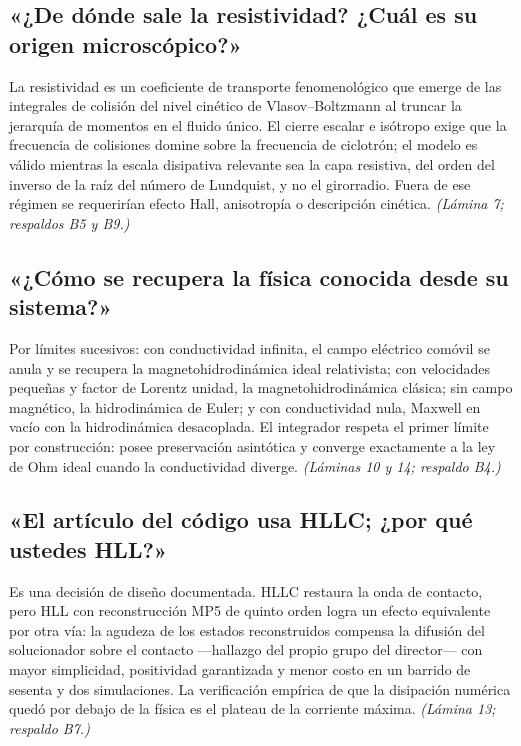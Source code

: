 \documentclass[11pt,letterpaper]{article}
\begin{document}
\subsection{«¿De dónde sale la resistividad? ¿Cuál es su origen microscópico?»}
La resistividad es un coeficiente de transporte fenomenológico que emerge
de las integrales de colisión del nivel cinético de Vlasov--Boltzmann al
truncar la jerarquía de momentos en el fluido único. El cierre escalar e
isótropo exige que la frecuencia de colisiones domine sobre la frecuencia
de ciclotrón; el modelo es válido mientras la escala disipativa relevante
sea la capa resistiva, del orden del inverso de la raíz del número de
Lundquist, y no el girorradio. Fuera de ese régimen se requerirían efecto
Hall, anisotropía o descripción cinética. \emph{(Lámina 7; respaldos B5 y
B9.)}

\subsection{«¿Cómo se recupera la física conocida desde su sistema?»}
Por límites sucesivos: con conductividad infinita, el campo eléctrico
comóvil se anula y se recupera la magnetohidrodinámica ideal relativista;
con velocidades pequeñas y factor de Lorentz unidad, la
magnetohidrodinámica clásica; sin campo magnético, la hidrodinámica de
Euler; y con conductividad nula, Maxwell en vacío con la hidrodinámica
desacoplada. El integrador respeta el primer límite por construcción:
posee preservación asintótica y converge exactamente a la ley de Ohm ideal
cuando la conductividad diverge. \emph{(Láminas 10 y 14; respaldo B4.)}

\subsection{«El artículo del código usa HLLC; ¿por qué ustedes HLL?»}
Es una decisión de diseño documentada. HLLC restaura la onda de contacto,
pero HLL con reconstrucción MP5 de quinto orden logra un efecto
equivalente por otra vía: la agudeza de los estados reconstruidos compensa
la difusión del solucionador sobre el contacto ---hallazgo del propio
grupo del director--- con mayor simplicidad, positividad garantizada y
menor costo en un barrido de sesenta y dos simulaciones. La verificación
empírica de que la disipación numérica quedó por debajo de la física es el
plateau de la corriente máxima. \emph{(Lámina 13; respaldo B7.)}

\end{document}
